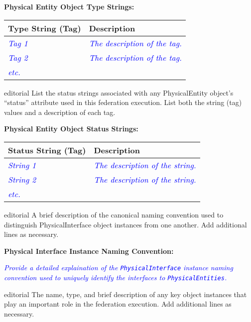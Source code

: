 \documentclass[11pt,english,letterpaper]{article}
\newcommand{\example}[1]{{\textcolor{blue}{\textit{#1}}}}
\begin{document}
\textbf{Physical Entity Object Type Strings: }

\begin{tabularx}{\textwidth}{|l|X|} \hline
Type String (Tag) & Description \\ \hline
\example{Tag 1} & \example{The description of the tag.} \\ \hline
\example{Tag 2} & \example{The description of the tag.} \\ \hline
\example{etc.} & \\ \hline
\end{tabularx}

\begin{shownto}{editorial}
{\color{red} List the status strings associated with any PhysicalEntity object’s
“status” attribute used in this federation execution. List both the string (tag)
values and a description of each tag.}
\end{shownto}

\textbf{Physical Entity Object Status Strings: }

\begin{tabularx}{\textwidth}{|l|X|} \hline
Status String (Tag) & Description \\ \hline
\example{String 1} & \example{The description of the string.} \\ \hline
\example{String 2} & \example{The description of the string.} \\ \hline
\example{etc.} &  \\ \hline
\end{tabularx}

\begin{shownto}{editorial}
{\color{red} A brief description of the canonical naming convention used to
distinguish PhysicalInterface object instances from one another. Add additional
lines as necessary.}
\end{shownto}

\textbf{Physical Interface Instance Naming Convention: }

\example{Provide a detailed explaination of the \texttt{PhysicalInterface}
instance naming convention used to uniquely identify the interfaces to
\texttt{PhysicalEntities}.}

\begin{shownto}{editorial}
{\color{red} The name, type, and brief description of any key object instances
that play an important role in the federation execution. Add additional lines
as necessary.}
\end{shownto}
\end{document}
